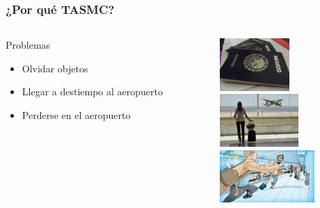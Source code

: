 \documentclass[12pt]{beamer}
\begin{document}
\begin{frame}
	\frametitle{¿Por qué TASMC?}
	\begin{columns} 
		\begin{column}{5cm} 
			\begin{block}{Problemas} \small 
				\begin{itemize}
					\item Olvidar objetos 
					\item Llegar a destiempo al aeropuerto
					\item Perderse en el aeropuerto
				\end{itemize} 
			\end{block} 
		\end{column}
		\begin{column}{5cm} 
			\begin{center}
				\includegraphics[height=2cm]{imagenes/pdocumento.jpg} \\
				\includegraphics[height=2cm]{imagenes/pinpuntual.jpg} \\
				\includegraphics[height=2cm]{imagenes/pperderse.jpg}
			\end{center} 
		\end{column} 
	\end{columns}
\end{frame}
\end{document}
